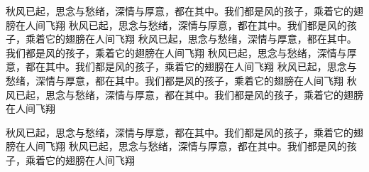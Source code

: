 秋风已起，思念与愁绪，深情与厚意，都在其中。我们都是风的孩子，乘着它的翅膀在人间飞翔
秋风已起，思念与愁绪，深情与厚意，都在其中。我们都是风的孩子，乘着它的翅膀在人间飞翔
秋风已起，思念与愁绪，深情与厚意，都在其中。我们都是风的孩子，乘着它的翅膀在人间飞翔
秋风已起，思念与愁绪，深情与厚意，都在其中。我们都是风的孩子，乘着它的翅膀在人间飞翔
秋风已起，思念与愁绪，深情与厚意，都在其中。我们都是风的孩子，乘着它的翅膀在人间飞翔
秋风已起，思念与愁绪，深情与厚意，都在其中。我们都是风的孩子，乘着它的翅膀在人间飞翔

秋风已起，思念与愁绪，深情与厚意，都在其中。我们都是风的孩子，乘着它的翅膀在人间飞翔
秋风已起，思念与愁绪，深情与厚意，都在其中。我们都是风的孩子，乘着它的翅膀在人间飞翔
